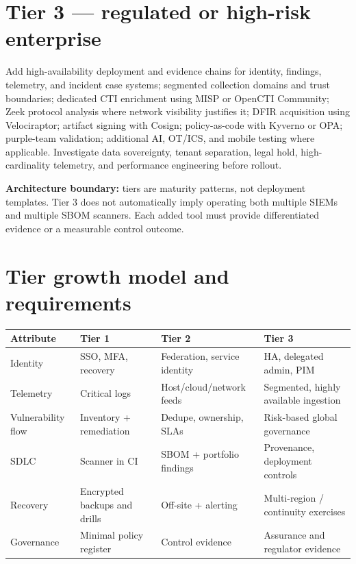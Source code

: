 \documentclass[11pt,oneside]{report}
\begin{document}
\section{Tier 3 --- regulated or high-risk enterprise}
Add high-availability deployment and evidence chains for identity, findings, telemetry, and incident case systems; segmented collection domains and trust boundaries; dedicated CTI enrichment using MISP or OpenCTI Community; Zeek protocol analysis where network visibility justifies it; DFIR acquisition using Velociraptor; artifact signing with Cosign; policy-as-code with Kyverno or OPA; purple-team validation; additional AI, OT/ICS, and mobile testing where applicable. Investigate data sovereignty, tenant separation, legal hold, high-cardinality telemetry, and performance engineering before rollout.

\begin{insight}
\textbf{Architecture boundary:} tiers are maturity patterns, not deployment templates. Tier 3 does not automatically imply operating both multiple SIEMs and multiple SBOM scanners. Each added tool must provide differentiated evidence or a measurable control outcome.
\end{insight}

\section{Tier growth model and requirements}

\noindent\begin{tabularx}{\textwidth}{P{0.21\textwidth}YYY}
\toprule Attribute & Tier 1 & Tier 2 & Tier 3\\\midrule
Identity & SSO, MFA, recovery & Federation, service identity & HA, delegated admin, PIM\\
Telemetry & Critical logs & Host/cloud/network feeds & Segmented, highly available ingestion\\
Vulnerability flow & Inventory + remediation & Dedupe, ownership, SLAs & Risk-based global governance\\
SDLC & Scanner in CI & SBOM + portfolio findings & Provenance, deployment controls\\
Recovery & Encrypted backups and drills & Off-site + alerting & Multi-region / continuity exercises\\
Governance & Minimal policy register & Control evidence & Assurance and regulator evidence\\
\bottomrule
\end{tabularx}
\end{document}

